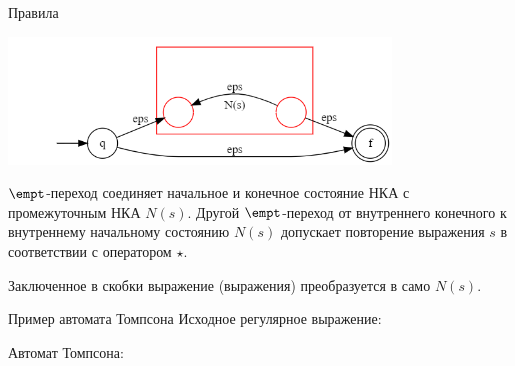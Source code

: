 \begin{frame}{Правила}
{        \includegraphics[width=4in, keepaspectratio]{tompson_rule5.png} %

        $\empt$-переход соединяет начальное и конечное состояние НКА с промежуточным НКА $N(s)$. Другой $\empt$-переход от внутреннего конечного к внутреннему начальному состоянию $N(s)$ допускает повторение выражения $s$ в соответствии с оператором $\star$.

        Заключенное в скобки выражение (выражения) преобразуется в само $N(s)$.
    }
\end{frame}%

\begin{frame}{Пример автомата Томпсона}
    Исходное регулярное выражение:

    Автомат Томпсона:

\end{frame}